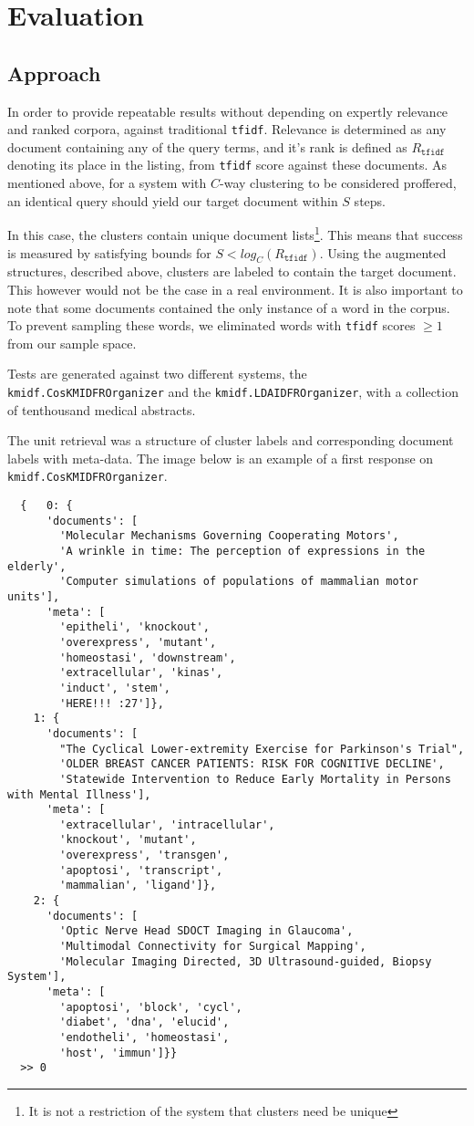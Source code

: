 \documentclass[11pt]{article}
\def\tfidf{\texttt{tfidf}\xspace}
\begin{document}
\section{Evaluation}
\subsection{Approach}
In order to provide repeatable results without depending on expertly relevance
and ranked corpora, against traditional \tfidf. Relevance
is determined as any document containing any of the query terms, and it's rank is
defined as $R_\tfidf$ denoting its place in the listing, from \tfidf score
against these documents. As mentioned above, for a system with $C$-way clustering
to be considered proffered, an identical query should yield our target document
within $S$ steps.

In this case, the clusters contain unique document lists\footnote{It is not a
  restriction of the system that clusters need be unique}. This means that success
is measured by satisfying bounds for \(S < log_C\left(R_\tfidf\right)\).
Using the augmented structures, described above, clusters are labeled to contain
the target document. This however would not be the case in a real environment.
It is also important to note that some documents contained the only instance of
a word in the corpus. To prevent sampling these words, we eliminated words with
\tfidf scores $\geq 1$ from our sample space.

Tests are generated against two different systems, the \texttt{kmidf.CosKMIDFROrganizer}
and the \texttt{kmidf.LDAIDFROrganizer}, with a collection of tenthousand medical
abstracts.

The unit retrieval was a structure of cluster labels and corresponding document labels with
meta-data. The image below is an example of a first response on \texttt{kmidf.CosKMIDFROrganizer}.

\begin{lstlisting}
  {   0: {
      'documents': [
        'Molecular Mechanisms Governing Cooperating Motors',
        'A wrinkle in time: The perception of expressions in the elderly',
        'Computer simulations of populations of mammalian motor units'],
      'meta': [
        'epitheli', 'knockout',
        'overexpress', 'mutant',
        'homeostasi', 'downstream',
        'extracellular', 'kinas',
        'induct', 'stem',
        'HERE!!! :27']},
    1: {
      'documents': [
        "The Cyclical Lower-extremity Exercise for Parkinson's Trial",
        'OLDER BREAST CANCER PATIENTS: RISK FOR COGNITIVE DECLINE',
        'Statewide Intervention to Reduce Early Mortality in Persons with Mental Illness'],
      'meta': [
        'extracellular', 'intracellular',
        'knockout', 'mutant',
        'overexpress', 'transgen',
        'apoptosi', 'transcript',
        'mammalian', 'ligand']},
    2: {
      'documents': [
        'Optic Nerve Head SDOCT Imaging in Glaucoma',
        'Multimodal Connectivity for Surgical Mapping',
        'Molecular Imaging Directed, 3D Ultrasound-guided, Biopsy System'],
      'meta': [
        'apoptosi', 'block', 'cycl',
        'diabet', 'dna', 'elucid',
        'endotheli', 'homeostasi',
        'host', 'immun']}}
  >> 0
\end{lstlisting}
\end{document}
